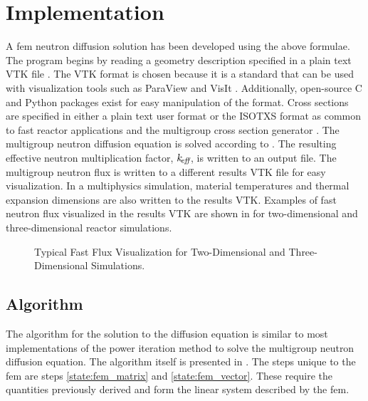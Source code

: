 \section{Implementation}
  A \gls{fem} neutron diffusion solution has been developed using 
  the above formulae. The program begins by reading a geometry description 
  specified in a plain text VTK file \cite{vtk}. The VTK format is chosen 
  because it is a standard that can be used with visualization tools such as 
  ParaView \cite{ParaView} and VisIt \cite{VisIt}. Additionally, open-source C 
  and Python packages exist for easy manipulation of the format. Cross sections
  are specified in either a plain text user format or the ISOTXS format as 
  common to fast reactor applications and the multigroup cross section generator
  \mcc \cite{mcc}. The multigroup neutron diffusion equation is solved according
  to . The resulting effective neutron multiplication 
  factor, $k_{\!\mbox{\scriptsize \em eff}}$, is written to an output file. The multigroup neutron flux is
  written to a different results VTK file for easy visualization. In a
  multiphysics simulation, material temperatures and thermal expansion
  dimensions are also written to the results VTK. Examples of fast neutron flux
  visualized in the results VTK are shown in  for
  two-dimensional and three-dimensional reactor simulations.

  \begin{figure}
    \centering
    \caption{Typical Fast Flux Visualization for Two-Dimensional and
      Three-Dimensional Simulations.}
    \label{fig:flux_visualization}
  \end{figure}

  \subsection{Algorithm}
    The algorithm for the solution to the diffusion equation is similar to most
    implementations of the power iteration method to solve the multigroup
    neutron diffusion equation. The algorithm itself is presented in 
    . The steps unique to the \gls{fem} are 
    steps \ref{state:fem_matrix} and \ref{state:fem_vector}. These require the 
    quantities previously derived and form the linear system described by the 
    \gls{fem}. 


